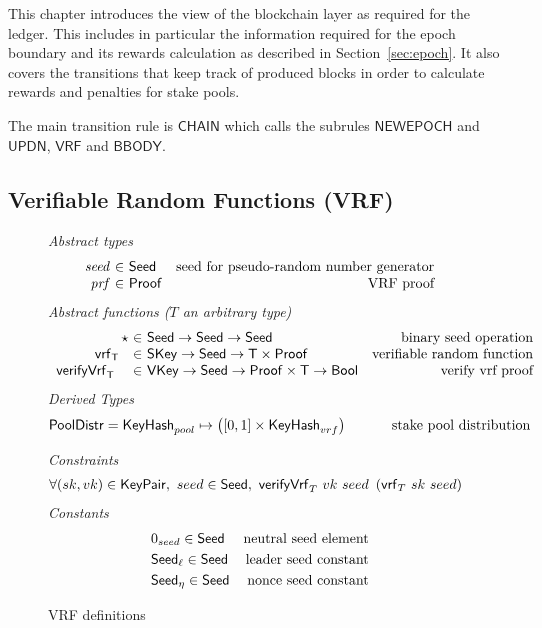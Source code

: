 This chapter introduces the view of the blockchain layer as required for the
ledger. This includes in particular the information required for the epoch
boundary and its rewards calculation as described in Section~\ref{sec:epoch}. It
also covers the transitions that keep track of produced blocks in order to
calculate rewards and penalties for stake pools.

The main transition rule is $\mathsf{CHAIN}$ which calls the subrules
$\mathsf{NEWEPOCH}$ and $\mathsf{UPDN}$, $\mathsf{VRF}$ and $\mathsf{BBODY}$.

\subsection{Verifiable Random Functions (VRF)}
\label{sec:defs-vrf}

\begin{figure}[htb]
  \emph{Abstract types}
  \begin{equation*}
    \begin{array}{r@{~\in~}lr}
      \var{seed} & \Seed  & \text{seed for pseudo-random number generator}\\
      \var{prf} & \Proof  & \text{VRF proof}\\
    \end{array}
  \end{equation*}
  \emph{Abstract functions ($T$ an arbitrary type)}
  \begin{equation*}
    \begin{array}{r@{~\in~}lr}
      \seedOp & \Seed \to \Seed \to \Seed & \text{binary seed operation} \\
      \vrf{\T}{}{} & \SKey \to \Seed \to \T\times\Proof
                   & \text{verifiable random function} \\
      \verifyVrf{\T}{}{}{} & \VKey \to \Seed \to \Proof\times\T \to \Bool
                           & \text{verify vrf proof} \\
    \end{array}
  \end{equation*}
  \emph{Derived Types}
  \begin{align*}
    \mathsf{PoolDistr} = \mathsf{KeyHash}_{pool} \mapsto \left([0, 1]\times\mathsf{KeyHash}_{vrf}\right)
      \text{ \hspace{1cm}stake pool distribution}
  \end{align*}

  \emph{Constraints}
  \begin{align*}
    & \forall (sk, vk) \in \mathsf{KeyPair},~ seed \in \mathsf{Seed},~
    \mathsf{verifyVrf}_{T} ~ vk ~ seed ~\left(\mathsf{vrf}_{T} ~ sk ~ seed\right)
  \end{align*}
  \emph{Constants}
  \begin{align*}
    & 0_{seed} \in \mathsf{Seed} & \text{neutral seed element} \\
    & \mathsf{Seed}_\ell \in \mathsf{Seed} & \text{leader seed constant} \\
    & \mathsf{Seed}_\eta \in \mathsf{Seed} & \text{nonce seed constant}\\
  \end{align*}

  \caption{VRF definitions}
  \label{fig:defs-vrf}
\end{figure}

